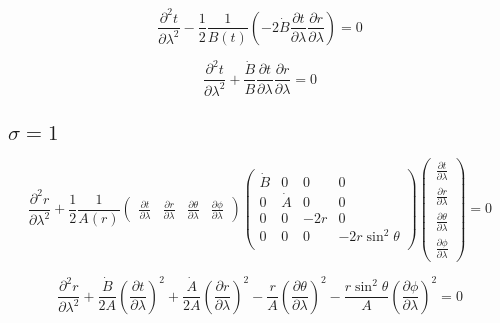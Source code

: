 \begin{equation}
    \frac{\partial^2 t}{\partial \lambda^2} -
    \frac{1}{2} \frac{1}{B(t)}
    \left(-2\dot{B} \frac{\partial t}{\partial \lambda}\frac{\partial r}{\partial \lambda}\right) = 0
\end{equation}

\begin{equation}
    \frac{\partial^2 t}{\partial \lambda^2} +
    \frac{\dot{B}}{B}
    \frac{\partial t}{\partial \lambda}\frac{\partial r}{\partial \lambda} = 0
\end{equation}

\subsection*{$\sigma = 1$}

\begin{equation}
    \frac{\partial^2 r}{\partial \lambda^2} +
    \frac{1}{2} \frac{1}{A(r)}
    \begin{pmatrix}
        \frac{\partial t}{\partial \lambda}      &
        \frac{\partial r}{\partial \lambda}      &
        \frac{\partial \theta}{\partial \lambda} &
        \frac{\partial \phi}{\partial \lambda}
    \end{pmatrix}
    \begin{pmatrix}
        \dot{B} & 0       & 0   & 0               \\
        0        & \dot{A} & 0   & 0               \\
        0        & 0       & -2r & 0               \\
        0        & 0       & 0   & -2r\sin^2\theta \\
    \end{pmatrix}
    \begin{pmatrix}
        \frac{\partial t}{\partial \lambda}      \\[6pt]
        \frac{\partial r}{\partial \lambda}      \\[6pt]
        \frac{\partial \theta}{\partial \lambda} \\[6pt]
        \frac{\partial \phi}{\partial \lambda}
    \end{pmatrix} = 0
\end{equation}

\begin{equation}
    \frac{\partial^2 r}{\partial \lambda^2} +
    \frac{\dot{B}}{2A}\left(\frac{\partial t}{\partial \lambda}\right)^2 +
    \frac{\dot{A}}{2A}\left(\frac{\partial r}{\partial \lambda}\right)^2 -
    \frac{r}{A}\left(\frac{\partial \theta}{\partial \lambda}\right)^2 -
    \frac{r\sin^2\theta}{A}\left(\frac{\partial \phi}{\partial \lambda}\right)^2 = 0
\end{equation}

